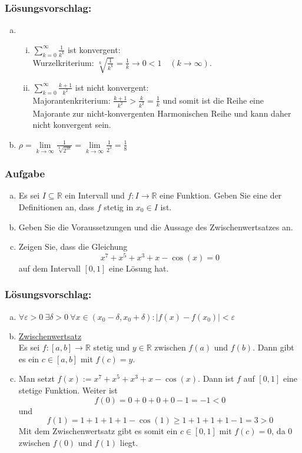 \documentclass[a4paper,11pt]{scrartcl}
\newcounter{auf}
\newcommand{\Aufgabe}%
        {\addtocounter{auf}{1} \subsubsection*{\rmfamily  Aufgabe \theauf \hspace{1em}} }
\newcommand{\RR}{\mathbb{R}}
\begin{document}
\subsubsection*{Lösungsvorschlag:}
\begin{enumerate}[a)] 
\item
	\begin{enumerate}[i)]
	\item $\sum \limits_{k=0}^\infty \frac{1}{k^k}$ ist konvergent:\\
	Wurzelkriterium: $\sqrt[k]{\frac{1}{k^k}}=\frac{1}{k} \to 0<1 \quad (k \to \infty)$.
	
	\item $\sum \limits_{k=0}^\infty \frac{k+1}{k^2}$ ist nicht konvergent:\\
	Majorantenkriterium: $\frac{k+1}{k^2}>\frac{k}{k^2}=\frac{1}{k}$ und somit ist die Reihe eine Majorante zur nicht-konvergenten Harmonischen Reihe und kann daher nicht konvergent sein.
	\end{enumerate}
\item $\rho=\lim \limits_{k \to \infty} \frac{1}{\sqrt[k]{2^{3k}}}=\lim \limits_{k \to \infty} \frac{1}{2^3}=\frac{1}{8}$
\end{enumerate}



\newpage
\Aufgabe 
\begin{enumerate}[a)]
\item Es sei $I \subseteq \RR$ ein Intervall und $f:I \to \RR$ eine Funktion. Geben Sie eine der Definitionen an, dass $f$ stetig in $x_0 \in I$ ist.

\item Geben Sie die Voraussetzungen und die Aussage des Zwischenwertsatzes an.

\item Zeigen Sie, dass die Gleichung
$$
x^7+x^5+x^3+x-\cos(x)=0
$$
auf dem Intervall $[0,1]$ eine Lösung hat.
\end{enumerate}

\subsubsection*{Lösungsvorschlag:}
\begin{enumerate}[a)]
\item $\forall \varepsilon >0\ \exists \delta>0\ \forall x \in (x_0-\delta, x_0+\delta): |f(x)-f(x_0)|< \varepsilon$

\item \underline{Zwischenwertsatz}\\ Es sei $f:[a,b] \to \RR$ stetig und $y \in \RR$ zwischen $f(a)$ und $f(b)$. Dann gibt es ein $c \in [a,b]$ mit $f(c)=y$.
\item Man setzt $f(x):=x^7+x^5+x^3+x-\cos(x)$. Dann ist $f$ auf $[0,1]$ eine stetige Funktion. Weiter ist 
$$f(0)=0+0+0+0-1=-1<0$$
und
$$f(1)=1+1+1+1-\cos(1)\ge 1+1+1+1-1=3>0$$
Mit dem Zwischenwertsatz gibt es somit ein $c\in[0,1]$ mit $f(c)=0$, da $0$ zwischen $f(0)$ und $f(1)$ liegt.

\end{enumerate}
\end{document}

